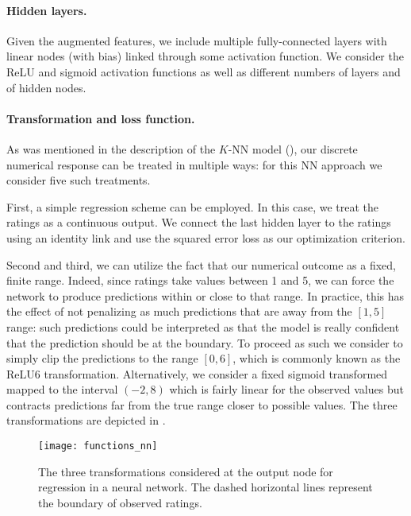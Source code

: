 \documentclass[bj, preprint]{imsart}
\begin{document}
\paragraph{Hidden layers.}\label{par:method.models.nn.hidden}

Given the augmented features, we include multiple fully-connected layers with linear nodes (with bias) linked through some activation function. We consider the ReLU and sigmoid activation functions as well as different numbers of layers and of hidden nodes.

\paragraph{Transformation and loss function.}\label{par:method.models.nn.transform}

As was mentioned in the description of the $K$-NN model (), our discrete numerical response can be treated in multiple ways: for this NN approach we consider five such treatments.

First, a simple regression scheme can be employed. In this case, we treat the ratings as a continuous output. We connect the last hidden layer to the ratings using an identity link and use the squared error loss as our optimization criterion.

Second and third, we can utilize the fact that our numerical outcome as a fixed, finite range. Indeed, since ratings take values between 1 and 5, we can force the network to produce predictions within or close to that range. In practice, this has the effect of not penalizing as much predictions that are away from the $[1,5]$ range: such predictions could be interpreted as that the model is really confident that the prediction should be at the boundary. To proceed as such we consider to simply clip the predictions to the range $[0,6]$, which is commonly known as the ReLU6 transformation. Alternatively, we consider a fixed sigmoid transformed mapped to the interval $(-2,8)$ which is fairly linear for the observed values but contracts predictions far from the true range closer to possible values. The three transformations are depicted in .

\begin{figure}[h]
\centering
\texttt{[image: functions\_nn]}
\caption{The three transformations considered at the output node for regression in a neural network. The dashed horizontal lines represent the boundary of observed ratings. }\label{fig:method.models.nn.functions}
\end{figure}
\end{document}
